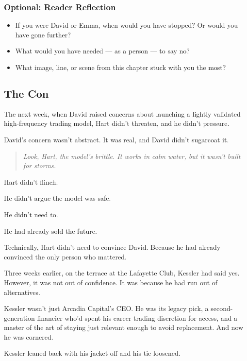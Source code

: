 \subsubsection{Optional: Reader Reflection}

\begin{itemize}
  \item If you were David or Emma, when would you have stopped? Or would you have gone further?
  \item What would you have needed — as a person — to say no?
  \item What image, line, or scene from this chapter stuck with you the most?
\end{itemize}




\subsection{The Con}

The next week, when David raised concerns about launching a lightly validated high-frequency trading model,  
Hart didn’t threaten, and he didn’t pressure.

David’s concern wasn’t abstract. It was real, and David didn’t sugarcoat it.

\begin{quote}
\textit{Look, Hart, the model’s brittle. It works in calm water, but it wasn’t built for storms.}
\end{quote}

Hart didn’t flinch.  

He didn’t argue the model was safe.  

He didn’t need to.  

He had already sold the future.

Technically, Hart didn’t need to convince David. Because he had already convinced the only person who mattered.

Three weeks earlier, on the terrace at the Lafayette Club,
Kessler had said yes. However, it was not out of confidence. It was because he had run out of alternatives.

Kessler wasn’t just Arcadia Capital’s CEO. 
He was its legacy pick, a second-generation financier who’d spent his career trading discretion for access, and a master 
of the art of staying just relevant enough to avoid replacement. And now he was cornered. 

Kessler leaned back with his jacket off and his tie loosened.


